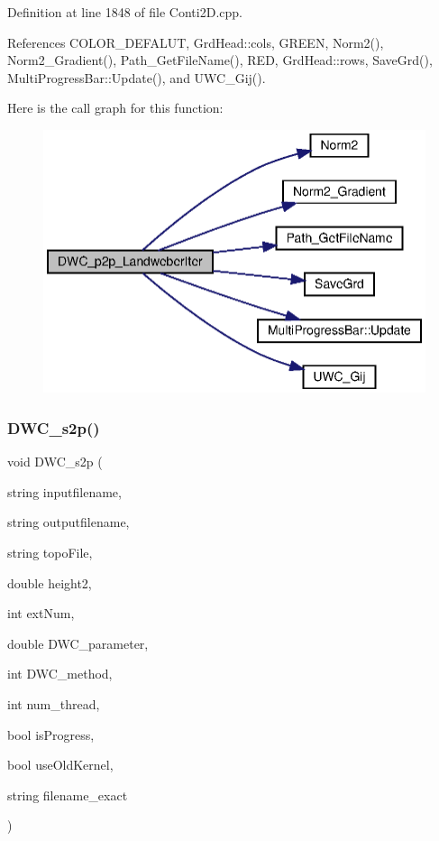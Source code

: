Definition at line 1848 of file Conti2\+D.\+cpp.



References C\+O\+L\+O\+R\+\_\+\+D\+E\+F\+A\+L\+UT, Grd\+Head\+::cols, G\+R\+E\+EN, Norm2(), Norm2\+\_\+\+Gradient(), Path\+\_\+\+Get\+File\+Name(), R\+ED, Grd\+Head\+::rows, Save\+Grd(), Multi\+Progress\+Bar\+::\+Update(), and U\+W\+C\+\_\+\+Gij().

Here is the call graph for this function\+:
\nopagebreak
\begin{figure}[H]
\begin{center}
\leavevmode
\includegraphics[width=342pt]{Conti2D_8cpp_a9a4db1b002682739ba7b888c536da886_a9a4db1b002682739ba7b888c536da886_cgraph}
\end{center}
\end{figure}
\mbox{\label{Conti2D_8cpp_ab256354d6264edd8deb4e31f98a7489f_ab256354d6264edd8deb4e31f98a7489f}} 
\subsubsection{D\+W\+C\+\_\+s2p()}
{\footnotesize\ttfamily void D\+W\+C\+\_\+s2p (\begin{DoxyParamCaption}\item[{string}]{inputfilename,  }\item[{string}]{outputfilename,  }\item[{string}]{topo\+File,  }\item[{double}]{height2,  }\item[{int}]{ext\+Num,  }\item[{double}]{D\+W\+C\+\_\+parameter,  }\item[{int}]{D\+W\+C\+\_\+method,  }\item[{int}]{num\+\_\+thread,  }\item[{bool}]{is\+Progress,  }\item[{bool}]{use\+Old\+Kernel,  }\item[{string}]{filename\+\_\+exact }\end{DoxyParamCaption})}



